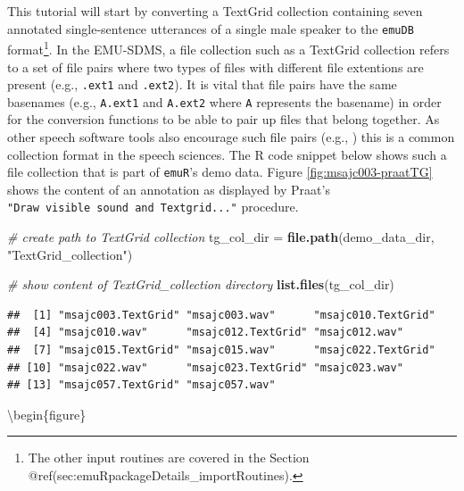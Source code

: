 \documentclass[]{book}
\newenvironment{Shaded}{\begin{snugshade}}{\end{snugshade}}
\newcommand{\CommentTok}[1]{\textcolor[rgb]{0.56,0.35,0.01}{\textit{#1}}}
\newcommand{\KeywordTok}[1]{\textcolor[rgb]{0.13,0.29,0.53}{\textbf{#1}}}
\newcommand{\NormalTok}[1]{#1}
\newcommand{\StringTok}[1]{\textcolor[rgb]{0.31,0.60,0.02}{#1}}
\let\rmarkdownfootnote\footnote%
\def\footnote{\protect\rmarkdownfootnote}
\begin{document}
This tutorial will start by converting a TextGrid collection containing seven annotated single-sentence utterances of a single male speaker to the \texttt{emuDB} format\footnote{The other input routines are covered in the Section @ref(sec:emuRpackageDetails\_importRoutines).}. In the EMU-SDMS, a file collection such as a TextGrid collection refers to a set of file pairs where two types of files with different file extentions are present (e.g., \texttt{.ext1} and \texttt{.ext2}). It is vital that file pairs have the same basenames (e.g., \texttt{A.ext1} and \texttt{A.ext2} where \texttt{A} represents the basename) in order for the conversion functions to be able to pair up files that belong together. As other speech software tools also encourage such file pairs (e.g., \citet{kisler:2015a}) this is a common collection format in the speech sciences. The R code snippet below shows such a file collection that is part of \texttt{emuR}'s demo data. Figure \ref{fig:msajc003-praatTG} shows the content of an annotation as displayed by Praat's \texttt{"Draw\ visible\ sound\ and\ Textgrid..."} procedure.

\begin{Shaded}
\begin{Highlighting}[]
\CommentTok{# create path to TextGrid collection}
\NormalTok{tg_col_dir =}\StringTok{ }\KeywordTok{file.path}\NormalTok{(demo_data_dir, }\StringTok{"TextGrid_collection"}\NormalTok{)}

\CommentTok{# show content of TextGrid_collection directory}
\KeywordTok{list.files}\NormalTok{(tg_col_dir)}
\end{Highlighting}
\end{Shaded}

\begin{verbatim}
##  [1] "msajc003.TextGrid" "msajc003.wav"      "msajc010.TextGrid"
##  [4] "msajc010.wav"      "msajc012.TextGrid" "msajc012.wav"     
##  [7] "msajc015.TextGrid" "msajc015.wav"      "msajc022.TextGrid"
## [10] "msajc022.wav"      "msajc023.TextGrid" "msajc023.wav"     
## [13] "msajc057.TextGrid" "msajc057.wav"
\end{verbatim}

\textbackslash{}begin\{figure\}
\end{document}
